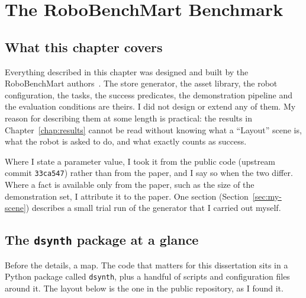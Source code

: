 \chapter{The RoboBenchMart Benchmark}
\label{chap:system}
\begingroup
\justifying
\setlength{\parindent}{2em}
\setlength{\parskip}{0.55\baselineskip}

\section{What this chapter covers}

Everything described in this chapter was designed and built by the RoboBenchMart authors~\cite{soshin2025robobenchmart}. The store generator, the asset library, the robot configuration, the tasks, the success predicates, the demonstration pipeline and the evaluation conditions are theirs. I did not design or extend any of them. My reason for describing them at some length is practical: the results in Chapter~\ref{chap:results} cannot be read without knowing what a ``Layout'' scene is, what the robot is asked to do, and what exactly counts as success.

Where I state a parameter value, I took it from the public code (upstream commit \texttt{33ca547}) rather than from the paper, and I say so when the two differ. Where a fact is available only from the paper, such as the size of the demonstration set, I attribute it to the paper. One section (Section~\ref{sec:my-scene}) describes a small trial run of the generator that I carried out myself.

\section{The \texttt{dsynth} package at a glance}
\label{sec:dsynth}

Before the details, a map. The code that matters for this dissertation sits in a Python package called \texttt{dsynth}, plus a handful of scripts and configuration files around it. The layout below is the one in the public repository, as I found it.

